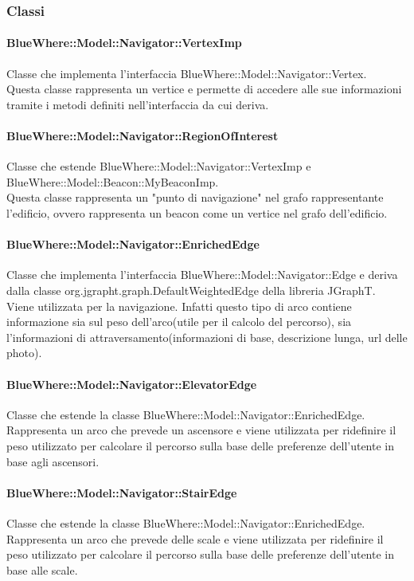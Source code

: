 \documentclass[../SpecificaTecnica.tex]{subfiles}
\begin{document}
			\subsubsection{Classi}
				\paragraph{BlueWhere::Model::Navigator::VertexImp}
					Classe che implementa l'interfaccia BlueWhere::Model::Navigator::Vertex. \\
					Questa classe rappresenta un vertice e permette di accedere alle sue informazioni tramite i metodi definiti nell'interfaccia da cui deriva.
				\paragraph{BlueWhere::Model::Navigator::RegionOfInterest}
					Classe che estende BlueWhere::Model::Navigator::VertexImp e BlueWhere::Model::Beacon::MyBeaconImp. \\
					Questa classe rappresenta un "punto di navigazione" nel grafo rappresentante l'edificio, ovvero rappresenta un beacon come un vertice nel grafo dell'edificio.
				\paragraph{BlueWhere::Model::Navigator::EnrichedEdge}
					Classe che implementa l'interfaccia BlueWhere::Model::Navigator::Edge e deriva dalla classe org.jgrapht.graph.DefaultWeightedEdge della libreria JGraphT. \\
					Viene utilizzata per la navigazione. Infatti questo tipo di arco contiene informazione sia sul peso dell'arco(utile per il calcolo del percorso), sia l'informazioni di attraversamento(informazioni di base, descrizione lunga, url delle photo).
				\paragraph{BlueWhere::Model::Navigator::ElevatorEdge}
					Classe che estende la classe BlueWhere::Model::Navigator::EnrichedEdge. \\
					Rappresenta un arco che prevede un ascensore e viene utilizzata per ridefinire il peso utilizzato per calcolare il percorso sulla base delle preferenze dell'utente in base agli ascensori.
				\paragraph{BlueWhere::Model::Navigator::StairEdge}
					Classe che estende la classe BlueWhere::Model::Navigator::EnrichedEdge. \\
					Rappresenta un arco che prevede delle scale e viene utilizzata per ridefinire il peso utilizzato per calcolare il percorso sulla base delle preferenze dell'utente in base alle scale.
\end{document}
